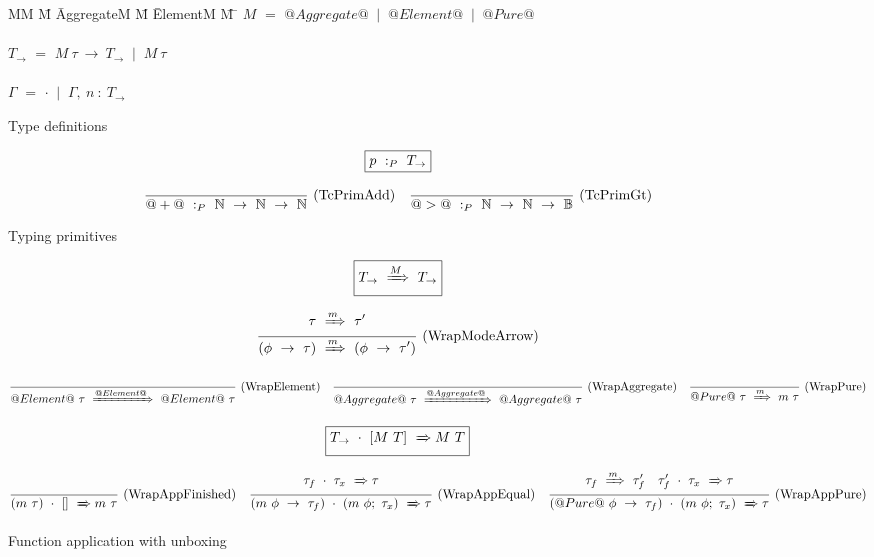 
\begin{figure}

\begin{tabbing}
MM \= M \= AggregateM \= M \= ElementM \= M \= \kill
$M$
    \> $=$  \> $@Aggregate@$ \> $~|~$ \> $@Element@$ \> $~|~$ \> $@Pure@$         \\
\\
$T_{\to}$
    \> $=$  
            \> $M~\tau~\to~T_{\to}$
            \> $~|~$
            \> $M~\tau$ \\
\\
$\Gamma$
    \> $=$  
            \> $\cdot$
            \> $~|~$
            \> $\Gamma,~n~:~T_\to$ \\
\end{tabbing}

\caption{Type definitions}
\label{fig:source:type:defs}
\end{figure}


\begin{figure*}

$$
\boxed{p ~:_{P}~ T_\to}
$$


$$
\frac {\displaystyle 
} {\displaystyle  
    @+@ ~:_{P}~ \mathbb{N}~\to~\mathbb{N}~\to~\mathbb{N}
} \ 
\textrm{(TcPrimAdd)}
\quad
\frac {\displaystyle 
} {\displaystyle 
    @>@ ~:_{P}~ \mathbb{N}~\to~\mathbb{N}~\to~\mathbb{B}
} \ 
\textrm{(TcPrimGt)}
$$

\caption{Typing primitives}
\label{fig:source:type:prim}
\end{figure*}


\begin{figure*}

$$
\boxed{T_{\to} ~\xRightarrow{M}~ T_{\to}}
$$

$$
\frac {\displaystyle 
    \tau ~\xRightarrow{m}~ \tau'
} {\displaystyle 
    (\phi~\to~\tau) ~\xRightarrow{m}~ (\phi~\to~\tau')
} \ 
\textrm{(WrapModeArrow)}
$$

$$
\frac {\displaystyle  } {\displaystyle 
    @Element@~\tau ~\xRightarrow{@Element@}~ @Element@~\tau
} \ 
\textrm{(WrapElement)}
\quad
\frac {\displaystyle  } {\displaystyle 
    @Aggregate@~\tau ~\xRightarrow{@Aggregate@}~ @Aggregate@~\tau
} \ 
\textrm{(WrapAggregate)}
\quad
\frac {\displaystyle  } {\displaystyle 
    @Pure@~\tau ~\xRightarrow{m}~ m~\tau
} \ 
\textrm{(WrapPure)}
$$


$$
\boxed{T_{\to}~\cdot~[M~T] ~\xRightarrow~ M~T}
$$

$$
\frac {\displaystyle 
} {\displaystyle 
    (m~\tau)~\cdot~[] ~\xRightarrow~ m~\tau
} \ 
\textrm{(WrapAppFinished)}
\quad
\frac {\displaystyle 
    \tau_f~\cdot~\tau_x ~\xRightarrow~ \tau
} {\displaystyle 
    (m~\phi~\to~\tau_f)~\cdot~(m~\phi;~\tau_x) ~\xRightarrow~ \tau
} \ 
\textrm{(WrapAppEqual)}
\quad
\frac {\displaystyle 
    \tau_f ~\xRightarrow{m}~ \tau_f'
    \quad
    \tau_f'~\cdot~\tau_x ~\xRightarrow~ \tau
} {\displaystyle 
    (@Pure@~\phi~\to~\tau_f)~\cdot~(m~\phi;~\tau_x) ~\xRightarrow~ \tau
} \ 
\textrm{(WrapAppPure)}
$$


\caption{Function application with unboxing}
\label{fig:source:type:wrap}
\end{figure*}

